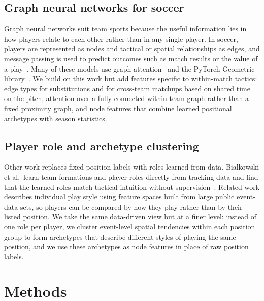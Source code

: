 \documentclass[11pt,twocolumn]{article}
\begin{document}
\subsection{Graph neural networks for soccer}
Graph neural networks suit team sports because the useful information
lies in how players relate to each other rather than in any single
player. In soccer, players are represented as nodes and tactical or
spatial relationships as edges, and message passing is used to predict
outcomes such as match results or the value of a play~\citep{xenopoulos2021}.
Many of these models use graph attention~\citep{velickovic2018} and the
PyTorch Geometric library~\citep{fey2019}. We build on this work but add
features specific to within-match tactics: edge types for substitutions
and for cross-team matchups based on shared time on the pitch, attention
over a fully connected within-team graph rather than a fixed proximity
graph, and node features that combine learned positional archetypes with
season statistics.

\subsection{Player role and archetype clustering}
Other work replaces fixed position labels with roles learned from data.
Bialkowski et al.\ learn team formations and player roles directly from
tracking data and find that the learned roles match tactical intuition
without supervision~\citep{bialkowski2014}. Related work describes
individual play style using feature spaces built from large public
event-data sets, so players can be compared by how
they play rather than by their listed position. We take the same
data-driven view but at a finer level: instead of one role per player, we
cluster event-level spatial tendencies within each position group to form
archetypes that describe different styles of playing the same position,
and we use these archetypes as node features in place of raw position
labels.

\section{Methods}
\end{document}
